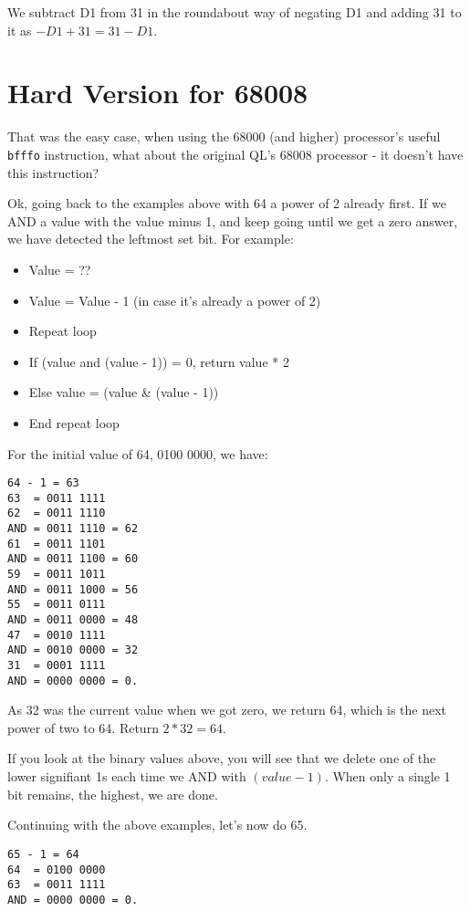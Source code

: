 We subtract D1 from 31 in the roundabout way of negating D1 and adding
31 to it as $-D1+31=31-D1$.

\section{Hard Version for 68008}

That was the easy case, when using the 68000 (and higher) processor's
useful \lstinline[showstringspaces=false,tabsize=4]!bfffo! instruction,
what about the original QL's 68008 processor - it doesn't have this
instruction?

Ok, going back to the examples above with 64 \textendash{} a power
of 2 already \textendash{} first. If we AND a value with the value
minus 1, and keep going until we get a zero answer, we have detected
the leftmost set bit. For example:
\begin{itemize}
\item Value = ??
\item Value = Value - 1 (in case it's already a power of 2)
\item Repeat loop
\item If (value and (value - 1)) = 0, return value {*} 2
\item Else value = (value \& (value - 1))
\item End repeat loop
\end{itemize}
For the initial value of 64, 0100 0000, we have:

\begin{lstlisting}[showstringspaces=false,tabsize=4]
64 - 1 = 63
63  = 0011 1111
62  = 0011 1110
AND = 0011 1110 = 62
61  = 0011 1101 
AND = 0011 1100 = 60
59  = 0011 1011
AND = 0011 1000 = 56
55  = 0011 0111
AND = 0011 0000 = 48
47  = 0010 1111
AND = 0010 0000 = 32
31  = 0001 1111 
AND = 0000 0000 = 0.
\end{lstlisting}

As 32 was the current value when we got zero, we return 64, which
is the next power of two to 64. Return $2*32=64$.

If you look at the binary values above, you will see that we delete
one of the lower signifiant 1s each time we AND with $(value-1)$.
When only a single 1 bit remains, the highest, we are done.

Continuing with the above examples, let's now do 65.

\begin{lstlisting}[showstringspaces=false,tabsize=4]
65 - 1 = 64
64  = 0100 0000
63  = 0011 1111
AND = 0000 0000 = 0.
\end{lstlisting}

